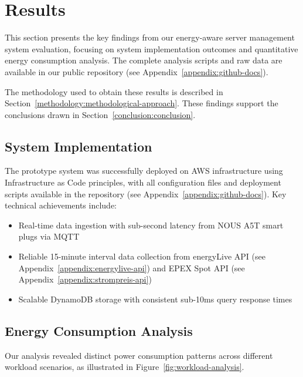 

\section{Results}
\label{results:results}
This section presents the key findings from our energy-aware server management system evaluation, focusing on system implementation outcomes and quantitative energy consumption analysis. The complete analysis scripts and raw data are available in our public repository (see Appendix~\ref{appendix:github-docs}).

The methodology used to obtain these results is described in Section~\ref{methodology:methodological-approach}. These findings support the conclusions drawn in Section~\ref{conclusion:conclusion}.

\subsection{System Implementation}
\label{results:system-implementation}
The prototype system was successfully deployed on AWS infrastructure using Infrastructure as Code principles, with all configuration files and deployment scripts available in the repository (see Appendix~\ref{appendix:github-docs}). Key technical achievements include:
\begin{itemize}[noitemsep,topsep=0pt]
    \item Real-time data ingestion with sub-second latency from NOUS A5T smart plugs via MQTT
    \item Reliable 15-minute interval data collection from energyLive API (see Appendix~\ref{appendix:energylive-api}) and EPEX Spot API (see Appendix~\ref{appendix:strompreis-api})
    \item Scalable DynamoDB storage with consistent sub-10ms query response times
\end{itemize}

\subsection{Energy Consumption Analysis}
\label{results:energy-analysis}
Our analysis revealed distinct power consumption patterns across different workload scenarios, as illustrated in Figure~\ref{fig:workload-analysis}.

